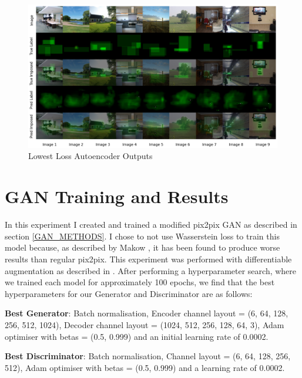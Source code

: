 \documentclass{UoYCSproject}
\begin{document}
\begin{figure}[ht]
    \centering
    \includegraphics[width=\linewidth]{Best autoencoder Outputs}
    \caption{Lowest Loss Autoencoder Outputs}
    \label{fig:autoencoderBestOutput}
\end{figure}

\section{GAN Training and Results}

In this experiment I created and trained a modified pix2pix GAN as described in section \ref{GAN_METHODS}. I chose to not use Wasserstein loss to train this model because, as described by Makow \cite{pix2pixwasserstein}, it has been found to produce worse results than regular pix2pix. This experiment was performed with differentiable augmentation as described in \cite{zhao2020differentiable}. After performing a hyperparameter search, where we trained each model for approximately 100 epochs, we find that the best hyperparameters for our Generator and Discriminator are as follows:

\textbf{Best Generator}: Batch normalisation, Encoder channel layout = (6, 64, 128, 256, 512, 1024), Decoder channel layout = (1024, 512, 256, 128, 64, 3), Adam optimiser with betas = (0.5, 0.999) and an initial learning rate of 0.0002.

\textbf{Best Discriminator}: Batch normalisation, Channel layout = (6, 64, 128, 256, 512), Adam optimiser with betas = (0.5, 0.999) and a learning rate of 0.0002.
\end{document}
